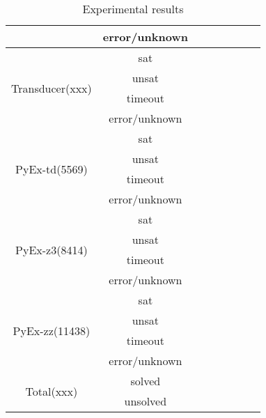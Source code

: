 \begin{table}[htbp]
\begin{center}
\begin{tabular}{|c|c|c|c|c|c|c|c|}
\cline{2-8}
 & error/unknown &  &  &  &  & &\\
\hline
\multirow{4}{*}{Transducer(xxx)} & \cellcolor{Gray} sat & \cellcolor{Gray} & \cellcolor{Gray} & \cellcolor{Gray} & \cellcolor{Gray} & \cellcolor{Gray} & \cellcolor{Gray}\\
\cline{2-8}
 & unsat &  &  &  &  & &\\
\cline{2-8}
 & \cellcolor{Gray}  timeout & \cellcolor{Gray} & \cellcolor{Gray} & \cellcolor{Gray} & \cellcolor{Gray} &\cellcolor{Gray} &\cellcolor{Gray} \\
\cline{2-8}
 & error/unknown &  &  &  &  & &\\
\hline
\multirow{4}{*}{PyEx-td(5569)} & \cellcolor{Gray} sat & \cellcolor{Gray} & \cellcolor{Gray} & \cellcolor{Gray} & \cellcolor{Gray} & \cellcolor{Gray} & \cellcolor{Gray}\\
\cline{2-8}
 & unsat &  &  &  &  & &\\
\cline{2-8}
 & \cellcolor{Gray}  timeout & \cellcolor{Gray} & \cellcolor{Gray} & \cellcolor{Gray} & \cellcolor{Gray} &\cellcolor{Gray} &\cellcolor{Gray} \\
\cline{2-8}
 & error/unknown &  &  &  &  & &\\
\hline
\multirow{4}{*}{PyEx-z3(8414)} & \cellcolor{Gray} sat & \cellcolor{Gray} & \cellcolor{Gray} & \cellcolor{Gray} & \cellcolor{Gray} & \cellcolor{Gray} & \cellcolor{Gray}\\
\cline{2-8}
 & unsat &  &  &  &  & &\\
\cline{2-8}
 & \cellcolor{Gray}  timeout & \cellcolor{Gray} & \cellcolor{Gray} & \cellcolor{Gray} & \cellcolor{Gray} &\cellcolor{Gray} &\cellcolor{Gray} \\
\cline{2-8}
 & error/unknown &  &  &  &  & &\\
\hline
\multirow{4}{*}{PyEx-zz(11438)} & \cellcolor{Gray} sat & \cellcolor{Gray} & \cellcolor{Gray} & \cellcolor{Gray} & \cellcolor{Gray} & \cellcolor{Gray} & \cellcolor{Gray}\\
\cline{2-8}
 & unsat &  &  &  &  & &\\
\cline{2-8}
 & \cellcolor{Gray}  timeout & \cellcolor{Gray} & \cellcolor{Gray} & \cellcolor{Gray} & \cellcolor{Gray} &\cellcolor{Gray} &\cellcolor{Gray} \\
\cline{2-8}
 & error/unknown &  &  &  &  & &\\
\hline
\multirow{2}{*}{Total(xxx)} & \cellcolor{Gray} solved & \cellcolor{Gray} & \cellcolor{Gray} & \cellcolor{Gray} & \cellcolor{Gray} & \cellcolor{Gray} & \cellcolor{Gray}\\
\cline{2-8}
 & \cellcolor{Gray}  unsolved & \cellcolor{Gray} & \cellcolor{Gray} & \cellcolor{Gray} & \cellcolor{Gray} &\cellcolor{Gray} &\cellcolor{Gray} \\
\hline
\end{tabular}
\end{center}
\caption{Experimental results}
\label{tab-experiment}
\end{table}%



